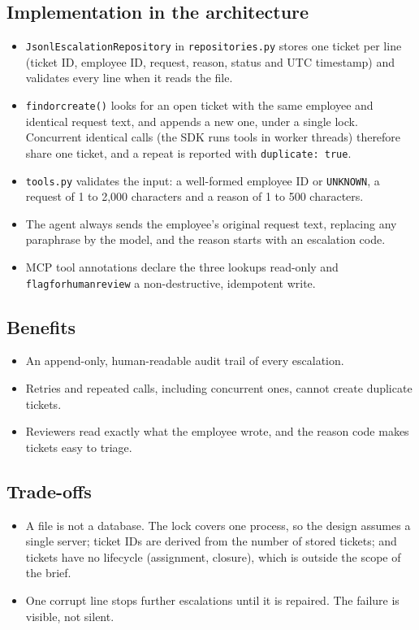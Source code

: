 \documentclass[11pt,letterpaper]{article}
\renewcommand{\_}{\textunderscore\allowbreak}
\begin{document}
\subsection*{Implementation in the architecture}
\begin{itemize}
  \item \texttt{JsonlEscalationRepository} in \texttt{repositories.py} stores one ticket per line
  (ticket ID, employee ID, request, reason, status and UTC timestamp) and validates every line
  when it reads the file.
  \item \texttt{find\_or\_create()} looks for an open ticket with the same employee and identical
  request text, and appends a new one, under a single lock. Concurrent identical calls (the SDK
  runs tools in worker threads) therefore share one ticket, and a repeat is reported with
  \texttt{duplicate: true}.
  \item \texttt{tools.py} validates the input: a well-formed employee ID or \texttt{UNKNOWN}, a
  request of 1 to 2,000 characters and a reason of 1 to 500 characters.
  \item The agent always sends the employee's original request text, replacing any paraphrase by
  the model, and the reason starts with an escalation code.
  \item MCP tool annotations declare the three lookups read-only and
  \texttt{flag\_for\_human\_review} a non-destructive, idempotent write.
\end{itemize}

\subsection*{Benefits}
\begin{itemize}
  \item An append-only, human-readable audit trail of every escalation.
  \item Retries and repeated calls, including concurrent ones, cannot create duplicate tickets.
  \item Reviewers read exactly what the employee wrote, and the reason code makes tickets easy to
  triage.
\end{itemize}

\subsection*{Trade-offs}
\begin{itemize}
  \item A file is not a database. The lock covers one process, so the design assumes a single
  server; ticket IDs are derived from the number of stored tickets; and tickets have no lifecycle
  (assignment, closure), which is outside the scope of the brief.
  \item One corrupt line stops further escalations until it is repaired. The failure is visible,
  not silent.
\end{itemize}
\end{document}
